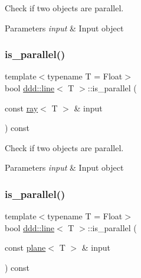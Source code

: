 Check if two objects are parallel. 


\begin{DoxyParams}{Parameters}
{\em input} & Input object \\
\hline
\end{DoxyParams}
\mbox{\label{classddd_1_1line_a57ddc03fe8add135eac64eeb88c3c5b8}} 
\subsubsection{\texorpdfstring{is\+\_\+parallel()}{is\_parallel()}\hspace{0.1cm}{\footnotesize\ttfamily [3/5]}}
{\footnotesize\ttfamily template$<$typename T = Float$>$ \\
bool \hyperlink{classddd_1_1line}{ddd\+::line}$<$ T $>$\+::is\+\_\+parallel (\begin{DoxyParamCaption}\item[{const \hyperlink{classddd_1_1ray}{ray}$<$ T $>$ \&}]{input }\end{DoxyParamCaption}) const\hspace{0.3cm}{\ttfamily [inline]}}



Check if two objects are parallel. 


\begin{DoxyParams}{Parameters}
{\em input} & Input object \\
\hline
\end{DoxyParams}
\mbox{\label{classddd_1_1line_affec7d381a8b3f3ce9786412893da61e}} 
\subsubsection{\texorpdfstring{is\+\_\+parallel()}{is\_parallel()}\hspace{0.1cm}{\footnotesize\ttfamily [4/5]}}
{\footnotesize\ttfamily template$<$typename T = Float$>$ \\
bool \hyperlink{classddd_1_1line}{ddd\+::line}$<$ T $>$\+::is\+\_\+parallel (\begin{DoxyParamCaption}\item[{const \hyperlink{classddd_1_1plane}{plane}$<$ T $>$ \&}]{input }\end{DoxyParamCaption}) const\hspace{0.3cm}{\ttfamily [inline]}}



